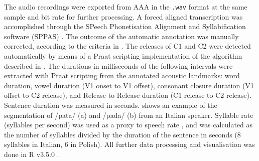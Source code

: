 \documentclass[preprint]{JASAnew}
\begin{document}

The audio recordings were exported from AAA in the \texttt{.wav} format
at the same sample and bit rate for further processing. A forced aligned
transcription was accomplished through the SPeech Phonetisation
Alignment and Syllabification software (SPPAS) \citep{bigi2015}. The
outcome of the automatic annotation was manually corrected, according to
the criteria in . The releases of C1 and C2 were
detected automatically by means of a Praat scripting implementation of
the algorithm described in \citet{ananthapadmanabha2014}. The durations
in milliseconds of the following intervals were extracted with Praat
scripting from the annotated acoustic landmarks: word duration, vowel
duration (V1 onset to V1 offset), consonant closure duration (V1 offset
to C2 release), and Release to Release duration (C1 release to C2
release). Sentence duration was measured in seconds.
 shows an example of the segmentation of /pata/ (a)
and /pada/ (b) from an Italian speaker. Syllable rate (syllables per
second) was used as a proxy to speech rate \citep{plug2018}, and was
calculated as the number of syllables divided by the duration of the
sentence in seconds (8 syllables in Italian, 6 in Polish). All further
data processing and visualisation was done in R v3.5.0
\citep{r-core-team2018, wickham2017}.
\end{document}
